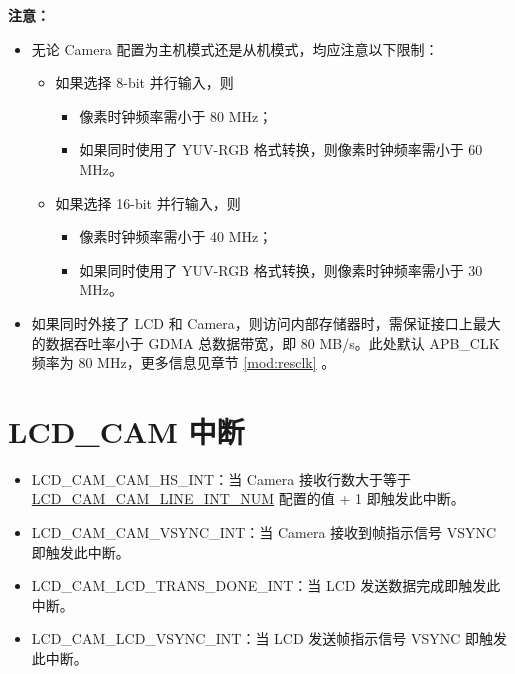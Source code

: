 \documentclass[main\_\_CN.tex]{subfiles}
\begin{document}
\textbf{注意：}
\begin{itemize}
    \item 无论 Camera 配置为主机模式还是从机模式，均应注意以下限制：
\begin{itemize}

    \item 如果选择 8-bit 并行输入，则
        \begin{itemize}
        \item 像素时钟频率需小于 80 MHz；
        \item 如果同时使用了 YUV-RGB 格式转换，则像素时钟频率需小于 60 MHz。
    \end{itemize}
    \item 如果选择 16-bit 并行输入，则
        \begin{itemize}
        \item 像素时钟频率需小于 40 MHz；
        \item 如果同时使用了 YUV-RGB 格式转换，则像素时钟频率需小于 30 MHz。
    \end{itemize}
\end{itemize}
\item 如果同时外接了 LCD 和 Camera，则访问内部存储器时，需保证接口上最大的数据吞吐率小于 GDMA 总数据带宽，即 80 MB/s。此处默认 APB\_CLK 频率为 80 MHz，更多信息见章节 \ref{mod:resclk} \textit{}。
\end{itemize}


\section{LCD\_CAM 中断} \label{LCDCAM_INT}

\begin{itemize}
\item \label{int:LCDCAMCAMHSINT}LCD\_CAM\_CAM\_HS\_INT：当 Camera 接收行数大于等于 \hyperref[fielddesc:LCDCAMCAMLINEINTNUM]{LCD\_CAM\_CAM\_LINE\_INT\_NUM} 配置的值 + 1 即触发此中断。
\item \label{int:LCDCAMCAMVSYNCINT}LCD\_CAM\_CAM\_VSYNC\_INT：当 Camera 接收到帧指示信号 VSYNC 即触发此中断。
\item \label{int:LCDCAMLCDTRANSDONEINT}LCD\_CAM\_LCD\_TRANS\_DONE\_INT：当 LCD 发送数据完成即触发此中断。
\item \label{int:LCDCAMLCDVSYNCINT}LCD\_CAM\_LCD\_VSYNC\_INT：当 LCD 发送帧指示信号 VSYNC 即触发此中断。
\end{itemize}


\end{document}
